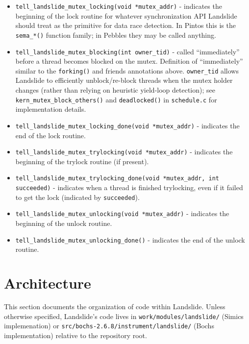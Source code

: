 \begin{itemize}
	\item {\tt tell\_landslide\_mutex\_locking(void *mutex\_addr)} - indicates the beginning of the lock routine for
		whatever synchronization API Landslide should treat as the primitive for data race detection.
		In Pintos this is the {\tt sema\_*()} function family; in Pebbles they may be called anything.
	\item {\tt tell\_landslide\_mutex\_blocking(int owner\_tid)} - called ``immediately'' before a thread becomes blocked on the mutex.
		Definition of ``immediately'' similar to the {\tt forking()} and friends annotations above.
		{\tt owner\_tid} allows Landslide to efficiently unblock/re-block threads when the mutex holder changes
		(rather than relying on heuristic yield-loop detection);
		see {\tt kern\_mutex\_block\_others()} and {\tt deadlocked()} in {\tt schedule.c} for implementation details.
	\item {\tt tell\_landslide\_mutex\_locking\_done(void *mutex\_addr)} - indicates the end of the lock routine.
	\item {\tt tell\_landslide\_mutex\_trylocking(void *mutex\_addr)} - indicates the beginning of the trylock routine (if present).
	\item {\tt tell\_landslide\_mutex\_trylocking\_done(void *mutex\_addr, int succeeded)} -
		indicates when a thread is finished trylocking, even if it failed to get the lock (indicated by {\tt succeeded}).
	\item {\tt tell\_landslide\_mutex\_unlocking(void *mutex\_addr)} - indicates the beginning of the unlock routine.
	\item {\tt tell\_landslide\_mutex\_unlocking\_done()} - indicates the end of the unlock routine.
\end{itemize}


\section{Architecture}

This section documents the organization of code within Landslide.
Unless otherwise specified, Landslide's code lives in
{\tt work/modules/landslide/} (Simics implemenation) or {\tt src/bochs-2.6.8/instrument/landslide/} (Bochs implementation)
relative to the repository root.

